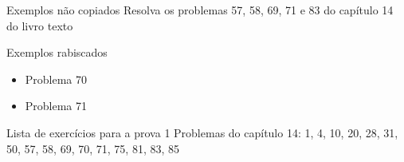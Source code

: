 \begin{frame}{Exemplos não copiados}
    Resolva os problemas 57, 58, 69, 71 e 83 do capítulo 14 do livro texto
\end{frame}

\begin{frame}{Exemplos rabiscados}
\begin{itemize}
    \item Problema 70
    \item Problema 71
\end{itemize}
\end{frame}

\begin{frame}{Lista de exercícios para a prova 1}
    Problemas do capítulo 14: 1, 4, 10, 20, 28, 31, 50, 57, 58, 69, 70, 71, 75, 81, 83, 85
\end{frame}




